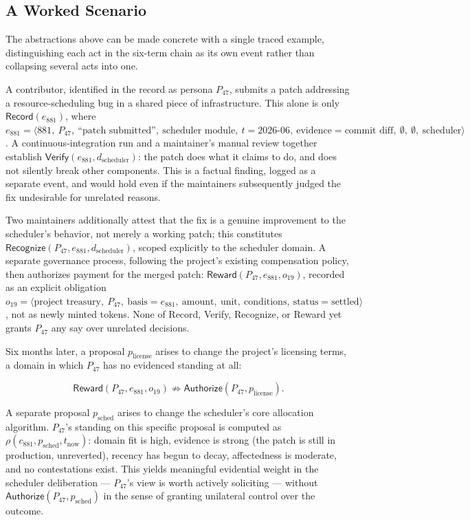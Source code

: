 \documentclass[11pt,oneside]{article}
\theoremstyle{plain}
\theoremstyle{definition}
\newcommand{\Record}{\mathsf{Record}}
\newcommand{\Verify}{\mathsf{Verify}}
\newcommand{\Recognize}{\mathsf{Recognize}}
\newcommand{\Reward}{\mathsf{Reward}}
\newcommand{\Authorize}{\mathsf{Authorize}}
\begin{document}
\subsection{A Worked Scenario}

The abstractions above can be made concrete with a single traced example, distinguishing each act in the six-term chain as its own event rather than collapsing several acts into one.

A contributor, identified in the record as persona $P_{47}$, submits a patch addressing a resource-scheduling bug in a shared piece of infrastructure. This alone is only $\Record(e_{881})$, where $e_{881} = \langle 881,\ P_{47},\ \text{``patch submitted''},\ \text{scheduler module},\ t{=}2026\text{-}06,\ \text{evidence}{=}\text{commit diff},\ \emptyset,\ \emptyset,\ \text{scheduler}\rangle$. A continuous-integration run and a maintainer's manual review together establish $\Verify(e_{881}, d_{\mathrm{scheduler}})$: the patch does what it claims to do, and does not silently break other components. This is a factual finding, logged as a separate event, and would hold even if the maintainers subsequently judged the fix undesirable for unrelated reasons.

Two maintainers additionally attest that the fix is a genuine improvement to the scheduler's behavior, not merely a working patch; this constitutes $\Recognize(P_{47}, e_{881}, d_{\mathrm{scheduler}})$, scoped explicitly to the scheduler domain. A separate governance process, following the project's existing compensation policy, then authorizes payment for the merged patch: $\Reward(P_{47}, e_{881}, o_{19})$, recorded as an explicit obligation $o_{19} = \langle \text{project treasury},\ P_{47},\ \text{basis}{=}e_{881},\ \text{amount},\ \text{unit},\ \text{conditions},\ \text{status}{=}\text{settled}\rangle$, not as newly minted tokens. None of Record, Verify, Recognize, or Reward yet grants $P_{47}$ any say over unrelated decisions.

Six months later, a proposal $p_{\text{license}}$ arises to change the project's licensing terms, a domain in which $P_{47}$ has no evidenced standing at all:

\begin{equation}
\Reward(P_{47}, e_{881}, o_{19}) \not\Rightarrow \Authorize(P_{47}, p_{\text{license}}).
\end{equation}

A separate proposal $p_{\text{sched}}$ arises to change the scheduler's core allocation algorithm. $P_{47}$'s standing on this specific proposal is computed as $\rho(c_{881}, p_{\text{sched}}, t_{\text{now}})$: domain fit is high, evidence is strong (the patch is still in production, unreverted), recency has begun to decay, affectedness is moderate, and no contestations exist. This yields meaningful evidential weight in the scheduler deliberation --- $P_{47}$'s view is worth actively soliciting --- without $\Authorize(P_{47}, p_{\text{sched}})$ in the sense of granting unilateral control over the outcome.
\end{document}
